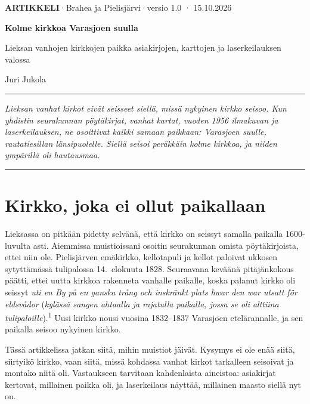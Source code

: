 \documentclass[11pt,a4paper]{article}
\newcommand{\viite}[1]{\textsuperscript{\sffamily\color{leima}#1}}
\newcommand{\sv}[2]{\textit{#1} (\textit{#2})}
\begin{document}
\thispagestyle{plain}

{\sffamily\small\color{leima}\textbf{ARTIKKELI}\quad·\quad Brahea ja Pielisjärvi\quad·\quad versio 1.0 · 15.10.2026}

\vspace{0.6em}
{\sffamily\bfseries\fontsize{26}{30}\selectfont\color{meri}Kolme kirkkoa Varasjoen suulla\par}

\vspace{0.5em}
{\sffamily\large\color{meri}Lieksan vanhojen kirkkojen paikka asiakirjojen, karttojen ja laserkeilauksen valossa\par}

\vspace{0.4em}
{\sffamily\small Juri Jukola\par}

\vspace{0.6em}
{\color{leima}\rule{\linewidth}{0.8pt}}

{\large\itshape Lieksan vanhat kirkot eivät seisseet siellä, missä nykyinen kirkko seisoo. Kun yhdistin seurakunnan pöytäkirjat, vanhat kartat, vuoden 1956 ilmakuvan ja laserkeilauksen, ne osoittivat kaikki samaan paikkaan: Varasjoen suulle, rautatiesillan länsipuolelle. Siellä seisoi peräkkäin kolme kirkkoa, ja niiden ympärillä oli hautausmaa.\par}

{\color{leima}\rule{\linewidth}{0.8pt}}

\section{Kirkko, joka ei ollut paikallaan}

Lieksassa on pitkään pidetty selvänä, että kirkko on seissyt samalla paikalla 1600-luvulta asti. Aiemmissa muistioissani osoitin seurakunnan omista pöytäkirjoista, ettei niin ole. Pielisjärven emäkirkko, kellotapuli ja kellot paloivat ukkosen sytyttämässä tulipalossa 14.~elokuuta 1828. Seuraavana keväänä pitäjänkokous päätti, ettei uutta kirkkoa rakenneta vanhalle paikalle, koska palanut kirkko oli seissyt \sv{uti en By på en ganska trång och inskränkt plats hwar den war utsatt för eldsvådor}{kylässä sangen ahtaalla ja rajatulla paikalla, jossa se oli alttiina tulipaloille}.\viite{1} Uusi kirkko nousi vuosina 1832--1837 Varasjoen etelärannalle, ja sen paikalla seisoo nykyinen kirkko.

Tässä artikkelissa jatkan siitä, mihin muistiot jäivät. Kysymys ei ole enää siitä, siirtyikö kirkko, vaan siitä, missä kohdassa vanhat kirkot tarkalleen seisoivat ja montako niitä oli. Vastaukseen tarvitaan kahdenlaista aineistoa: asiakirjat kertovat, millainen paikka oli, ja laserkeilaus näyttää, millainen maasto siellä nyt on.
\end{document}
